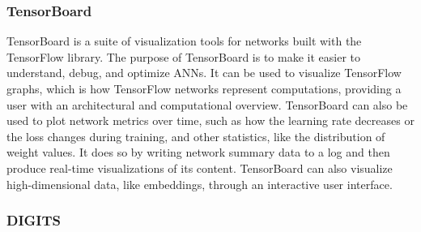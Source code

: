 \subsubsection{TensorBoard}

\begin{comment}
\textit{TensorBoard is a suite of visualization tools for TensorFlow programs. The purpose of TensorBoard is to make it easier to understand, debug, and optimize artificial neural networks. It can be used to visualize TensorFlow graphs, which is TensorFlow's way of representing computations. It can also be used to plot network metrics, such as how the learning rate varies over time, or how the loss function is changing. This is done by annotating the nodes of the graph with so called summary operations, that writes summary data to a log. TensorBoard then reads this log, in order to generate real-time visualizations. The visualizations are mostly restricted to plots, histograms and visualizations of the network architecture. However, it can also visualize high-dimensional data like embeddings, with a very interactive user interface. Functionality for writing to the TensorBoard log is also included in Keras, but only for the basic visualizations, and with limited customizability.}
\end{comment}

TensorBoard is a suite of visualization tools for networks built with the TensorFlow library. The purpose of TensorBoard is to make it easier to understand, debug, and optimize ANNs. It can be used to visualize TensorFlow graphs, which is how TensorFlow networks represent computations, providing a user with an architectural and computational overview. TensorBoard can also be used to plot network metrics over time, such as how the learning rate decreases or the loss changes during training, and other statistics, like the distribution of weight values. It does so by writing network summary data to a log and then produce real-time visualizations of its content. TensorBoard can also visualize high-dimensional data, like embeddings, through an interactive user interface.

\begin{comment}
Drawbacks:
- No managing of networks.
- No advanced visualizations.
\end{comment}

\subsubsection{DIGITS}

